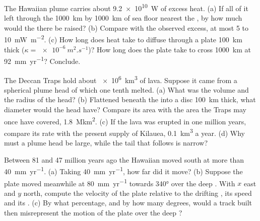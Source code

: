 \begin{exercise}[$\star\star$]\label{exo:b1:hotspots:9}
The Hawaiian plume carries about \qty{9.2e10}{W} of excess heat. (a) If all of
it left through the \qty{1000}{km} by \qty{1000}{km} of sea floor nearest the
, by how much would the  there be raised? (b) Compare with the
observed excess, at most 5 to \qty{10}{mW.m^{-2}}. (c) How long does heat take to
diffuse through a plate \qty{100}{km} thick ($\kappa = \qty{e-6}{m^2.s^{-1}}$)?
How long does the plate take to cross \qty{1000}{km} at \qty{92}{mm.yr^{-1}}?
Conclude.
\end{exercise}

\begin{exercise}[$\star\star\star$]\label{exo:b1:hotspots:10}
The Deccan Traps hold about \qty{e6}{km^3} of lava. Suppose it came from a
spherical plume head of which one tenth melted. (a) What was the volume and
the radius of the head? (b) Flattened beneath the  into a disc
\qty{100}{km} thick, what diameter would the head have? Compare its area with
the area the Traps may once have covered, \qty{1.8}{\mega km^2}. (c) If the
lava was erupted in one million years, compare its rate with the present
supply of Kilauea, \qty{0.1}{km^3} a year. (d) Why must a plume head be large,
while the tail that follows is narrow?
\end{exercise}

\begin{exercise}[$\star\star\star$]\label{exo:b1:hotspots:11}
Between 81 and 47 million years ago the Hawaiian  moved south at more
than \qty{40}{mm.yr^{-1}}. (a) Taking \qty{40}{mm.yr^{-1}}, how far did it
move?
(b) Suppose the plate moved meanwhile at \qty{80}{mm.yr^{-1}} towards
\ang{340} over the deep . With $x$ east and $y$ north, compute the
velocity of the plate relative to the drifting , its speed and its
. (c) By what percentage, and by how many degrees, would a track built
then misrepresent the motion of the plate over the deep ?
\end{exercise}

